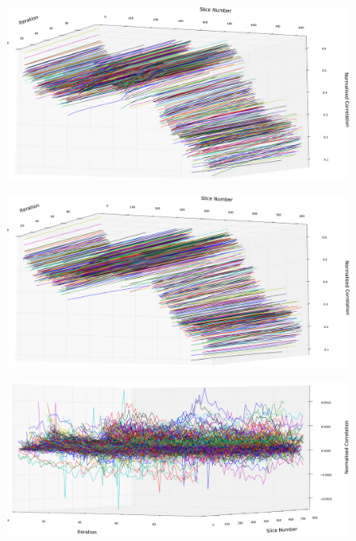       \begin{figure}
        \centering
        \includegraphics[width=\textheight]{Ch6/Figs/diagnostics/similarity_metric_values}
        \caption{}
        \label{fig:similarity_metric_values}
      \end{figure}
      
      \begin{figure}
        \centering
        \includegraphics[width=\textheight]{Ch6/Figs/diagnostics/affine_metric_values}
        \caption{}
        \label{fig:affine_metric_values}
      \end{figure}
      
      \begin{figure}
        \centering
        \includegraphics[width=\textheight]{Ch6/Figs/diagnostics/affine_metric_value_differences}
        \caption{}
        \label{fig:affine_metric_value_differences}
      \end{figure}
      
